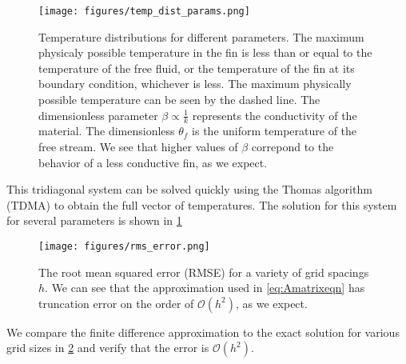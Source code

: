 \documentclass[10pt,letterpaper,notitlepage]{article}
\begin{document}
    \begin{figure}
        \centering
        \texttt{[image: figures/temp\_dist\_params.png]}
        \caption[Steady state fin temperature distributions for different parameters]{Temperature distributions for different parameters. The maximum physicaly possible temperature in the fin is less than or equal to the temperature of the free fluid, or the temperature of the fin at its boundary condition, whichever is less. The maximum physically possible temperature can be seen by the dashed line. The dimensionless parameter $\beta \propto \frac{1}{k}$ represents the conductivity of the material. The dimensionless $\theta_f$ is the uniform temperature of the free stream. We see that higher values of $\beta$ correpond to the behavior of a less conductive fin, as we expect.}
        \label{fig:TemperatureDistributions}
    \end{figure}
    This tridiagonal system can be solved quickly using the Thomas algorithm (TDMA) to obtain the full vector of temperatures. The solution for this system for several parameters is shown in \cref{fig:TemperatureDistributions}
    \begin{figure}
        \centering
        \texttt{[image: figures/rms\_error.png]}
        \caption[Error analysis of steady state fin temperatures]{The root mean squared error (RMSE) for a variety of grid spacings $h$. We can see that the approximation used in \cref{eq:Amatrixeqn} has truncation error on the order of $\mathcal{O}(h^2)$, as we expect.}
        \label{fig:RMSError}
    \end{figure}
    We compare the finite difference approximation to the exact solution for various grid sizes in \cref{fig:RMSError} and verify that the error is $\mathcal{O}(h^2)$. 
\end{document}
